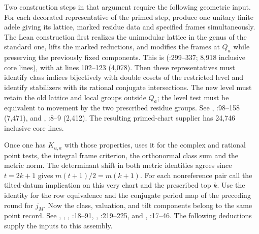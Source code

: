 Two construction steps in that argument require the following geometric input.
For each decorated representative of the primed step, produce one
unitary finite adele giving its lattice, marked residue data and
specified frames simultaneously. The Lean construction first realizes
the unimodular lattice in the genus of the standard one, lifts the
marked reductions, and modifies the frames at $Q_a$ while preserving
the previously fixed components. This is 
(:299--337; 8,918 inclusive core lines), with
 at lines 102--123 (4,078).
Then these representatives must identify class indices bijectively
with double cosets of the restricted level and identify stabilizers
with its rational conjugate intersections. The new level must retain
the old lattice and local groups outside $Q_a$; the level test must be
equivalent to movement by the two prescribed residue groups.
See ,
:98--158 (7,471),
and ,
:8--9 (2,412).
The resulting primed-chart supplier has 24,746 inclusive core lines.

Once one has $K_{u,a}$ with those properties,  uses it
for the complex and rational point tests, the integral frame criterion,
the orthonormal class sum and the metric norm. The determinant shift
in both metric identities agrees since $t=2k+1$ gives
$m(t+1)/2=m(k+1)$. For each nonreference pair call the tilted-datum
implication on this very chart and the prescribed top $k$. Use the
identity for the row equivalence and the conjugate period map of
the preceding round for $j_M$. Now the class, valuation, and tilt
components belong to the same point record. See ,
, , :18--91,
, :219--225, and
, :17--46.
The following deductions supply the inputs to this assembly.

